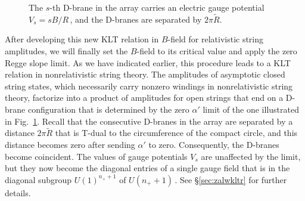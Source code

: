 \documentclass[11pt]{article}
\renewcommand{\tilde}[1]{\widetilde{#1}}
\begin{document}
\begin{figure}[t!]
%
\caption{The $s$-th D-brane in the array carries an electric gauge potential $V_s = s B / R$\,, and the D-branes are separated by $2\pi \tilde{R}$.}
\label{fig:osampwithpotential}
\end{figure}

After developing this new KLT relation in $B$-field for relativistic string amplitudes, we will finally set the $B$-field to its critical value and apply the zero Regge slope limit. As we have indicated earlier, this procedure leads to a KLT relation in nonrelativistic string theory. The amplitudes of asymptotic closed string states, which necessarily carry nonzero windings in nonrelativistic string theory, factorize into a product of amplitudes for open strings that end on a D-brane configuration that is determined by the zero $\alpha'$ limit of the one illustrated in Fig.~\ref{fig:osampwithpotential}. Recall that the consecutive D-branes in the array are separated by a distance $2 \pi \tilde{R}$ that is T-dual to the circumference of the compact circle, and this distance becomes zero after sending $\alpha'$ to zero. Consequently, the D-branes become coincident. The values of gauge potentials $V_s$ are unaffected by the limit, but they now become the diagonal entries of a single gauge field that is in the diagonal subgroup $U(1)^{n_+ + 1}$ of $U(n_+ \! + 1)$\,. See \S\ref{sec:zalwkltr} for further details.   
\end{document}
